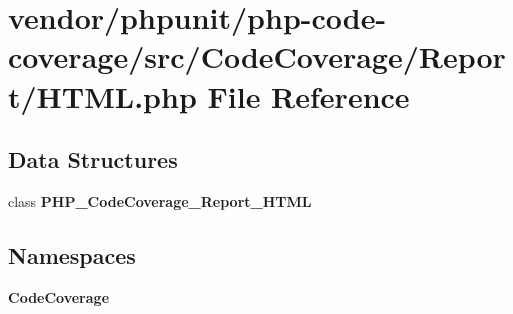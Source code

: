 \section{vendor/phpunit/php-\/code-\/coverage/src/\+Code\+Coverage/\+Report/\+H\+T\+M\+L.php File Reference}
\label{php-code-coverage_2src_2_code_coverage_2_report_2_h_t_m_l_8php}
\subsection*{Data Structures}
\begin{DoxyCompactItemize}
\item 
class {\bf P\+H\+P\+\_\+\+Code\+Coverage\+\_\+\+Report\+\_\+\+H\+T\+M\+L}
\end{DoxyCompactItemize}
\subsection*{Namespaces}
\begin{DoxyCompactItemize}
\item 
 {\bf Code\+Coverage}
\end{DoxyCompactItemize}
